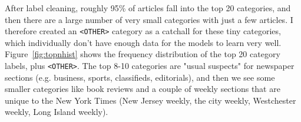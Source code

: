 \documentclass[11pt,a4paper,table]{article}
\begin{document}
\begin{table}
\centering
{}
\caption{Label Cleaning Examples}
\label{tbl:label-clean}
\end{table}

After label cleaning, roughly 95\% of articles fall into the top 20 categories, and then there are a large number of very small categories with just a few articles. I therefore created an \texttt{<OTHER>} category as a catchall for these tiny categories, which individually don't have enough data for the models to learn very well. Figure~\ref{fig:topnhist} shows the frequency distribution of the top 20 category labels, plus \texttt{<OTHER>}. The top 8-10 categories are "usual suspects" for newspaper sections (e.g. business, sports, classifieds, editorials), and then we see some smaller categories like book reviews and a couple of weekly sections that are unique to the New York Times (New Jersey weekly, the city weekly, Westchester weekly, Long Island weekly).
\end{document}
